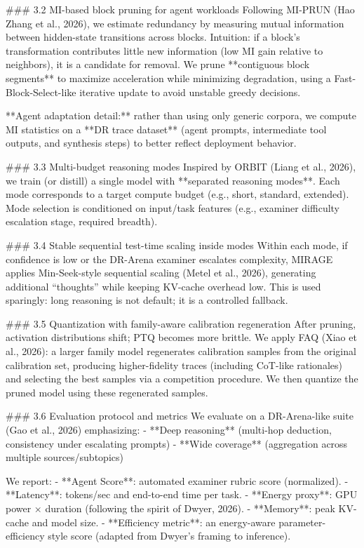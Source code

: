 ### 3.2 MI-based block pruning for agent workloads  
Following MI-PRUN (Hao Zhang et al., 2026), we estimate redundancy by measuring mutual information between hidden-state transitions across blocks. Intuition: if a block’s transformation contributes little new information (low MI gain relative to neighbors), it is a candidate for removal. We prune **contiguous block segments** to maximize acceleration while minimizing degradation, using a Fast-Block-Select-like iterative update to avoid unstable greedy decisions.

**Agent adaptation detail:** rather than using only generic corpora, we compute MI statistics on a **DR trace dataset** (agent prompts, intermediate tool outputs, and synthesis steps) to better reflect deployment behavior.

### 3.3 Multi-budget reasoning modes  
Inspired by ORBIT (Liang et al., 2026), we train (or distill) a single model with **separated reasoning modes**. Each mode corresponds to a target compute budget (e.g., short, standard, extended). Mode selection is conditioned on input/task features (e.g., examiner difficulty escalation stage, required breadth).

### 3.4 Stable sequential test-time scaling inside modes  
Within each mode, if confidence is low or the DR-Arena examiner escalates complexity, MIRAGE applies Min-Seek-style sequential scaling (Metel et al., 2026), generating additional “thoughts” while keeping KV-cache overhead low. This is used sparingly: long reasoning is not default; it is a controlled fallback.

### 3.5 Quantization with family-aware calibration regeneration  
After pruning, activation distributions shift; PTQ becomes more brittle. We apply FAQ (Xiao et al., 2026): a larger family model regenerates calibration samples from the original calibration set, producing higher-fidelity traces (including CoT-like rationales) and selecting the best samples via a competition procedure. We then quantize the pruned model using these regenerated samples.

### 3.6 Evaluation protocol and metrics  
We evaluate on a DR-Arena-like suite (Gao et al., 2026) emphasizing:
- **Deep reasoning** (multi-hop deduction, consistency under escalating prompts)  
- **Wide coverage** (aggregation across multiple sources/subtopics)

We report:
- **Agent Score**: automated examiner rubric score (normalized).  
- **Latency**: tokens/sec and end-to-end time per task.  
- **Energy proxy**: GPU power × duration (following the spirit of Dwyer, 2026).  
- **Memory**: peak KV-cache and model size.  
- **Efficiency metric**: an energy-aware parameter-efficiency style score (adapted from Dwyer’s framing to inference).

